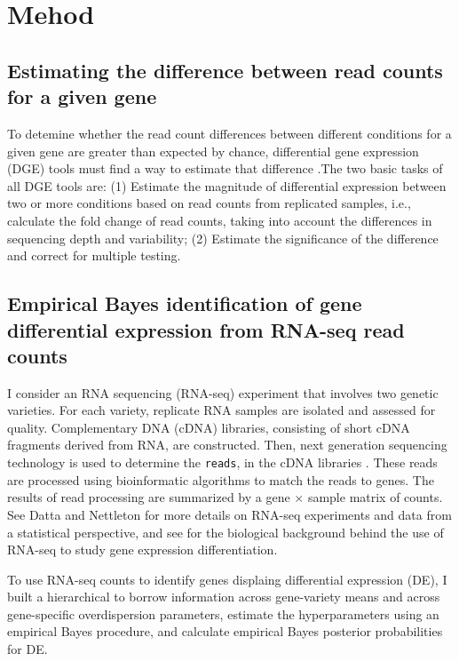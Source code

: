 \chapter{Mehod}

\section{Estimating the difference between read counts for a given gene}

To detemine whether the read count differences between different conditions for a given gene are greater than expected by chance, differential gene expression (DGE) tools must find a way to estimate that difference \citep{dundar2015introduction}.The two basic tasks of all DGE tools are: (1) Estimate the magnitude of differential expression between two or more conditions based on read counts from replicated samples, i.e., calculate the fold change of read counts, taking into account the differences in sequencing depth and variability; (2) Estimate the significance of the difference and correct for multiple testing. 

\section{Empirical Bayes identification of gene differential expression from RNA-seq read counts}

I consider an RNA sequencing (RNA-seq) experiment that involves two genetic varieties. For each variety, replicate RNA samples are isolated and assessed for quality. Complementary DNA (cDNA) libraries, consisting of short cDNA fragments derived from RNA, are constructed. Then, next generation sequencing technology is used to determine the {\tt reads}, in the cDNA libraries \citep{niemi2015empirical}. These reads are processed using bioinformatic algorithms to match the reads to genes. The results of read processing are summarized by a gene $\times$ sample matrix of counts. See Datta and Nettleton \citep{datta2014statistical} for more details on RNA-seq experiments and data from a statistical perspective, and see \citep{paschold2012complementation} for the biological background behind the use of RNA-seq to study gene expression differentiation. 

To use RNA-seq counts to identify genes displaing differential expression (DE), I built a hierarchical to borrow information across gene-variety means and across gene-specific overdispersion parameters, estimate the hyperparameters using an empirical Bayes procedure, and calculate empirical Bayes posterior probabilities for DE. 

